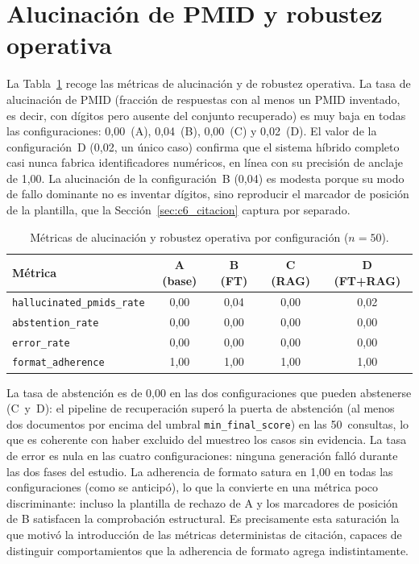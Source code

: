 \documentclass[11pt,a4paper,spanish]{book}
\numberwithin{equation}{chapter}
\numberwithin{figure}{chapter}
\begin{document}
\section{Alucinación de PMID y robustez operativa}
\label{sec:c6_robustez}

La Tabla~\ref{tab:c6_robustez} recoge las métricas de alucinación y de robustez operativa. La tasa de alucinación de PMID (fracción de respuestas con al menos un PMID inventado, es decir, con dígitos pero ausente del conjunto recuperado) es muy baja en todas las configuraciones: 0{,}00~(A), 0{,}04~(B), 0{,}00~(C) y 0{,}02~(D). El valor de la configuración~D (0{,}02, un único caso) confirma que el sistema híbrido completo casi nunca fabrica identificadores numéricos, en línea con su precisión de anclaje de 1{,}00. La alucinación de la configuración~B (0{,}04) es modesta porque su modo de fallo dominante no es inventar dígitos, sino reproducir el marcador de posición de la plantilla, que la Sección~\ref{sec:c6_citacion} captura por separado.

\begin{table}[h]
\centering
\begin{tabular}{|l|c|c|c|c|}
\hline
\textbf{Métrica} & \textbf{A (base)} & \textbf{B (FT)} & \textbf{C (RAG)} & \textbf{D (FT+RAG)} \\
\hline
\texttt{hallucinated\_pmids\_rate} & 0{,}00 & 0{,}04 & 0{,}00 & 0{,}02 \\
\hline
\texttt{abstention\_rate}         & 0{,}00 & 0{,}00 & 0{,}00 & 0{,}00 \\
\hline
\texttt{error\_rate}              & 0{,}00 & 0{,}00 & 0{,}00 & 0{,}00 \\
\hline
\texttt{format\_adherence}        & 1{,}00 & 1{,}00 & 1{,}00 & 1{,}00 \\
\hline
\end{tabular}
\caption{Métricas de alucinación y robustez operativa por configuración ($n=50$).}
\label{tab:c6_robustez}
\end{table}

La tasa de abstención es de 0{,}00 en las dos configuraciones que pueden abstenerse (C~y~D): el pipeline de recuperación superó la puerta de abstención (al menos dos documentos por encima del umbral \texttt{min\_final\_score}) en las 50~consultas, lo que es coherente con haber excluido del muestreo los casos sin evidencia. La tasa de error es nula en las cuatro configuraciones: ninguna generación falló durante las dos fases del estudio. La adherencia de formato satura en 1{,}00 en todas las configuraciones (como se anticipó), lo que la convierte en una métrica poco discriminante: incluso la plantilla de rechazo de A y los marcadores de posición de B satisfacen la comprobación estructural. Es precisamente esta saturación la que motivó la introducción de las métricas deterministas de citación, capaces de distinguir comportamientos que la adherencia de formato agrega indistintamente.
\end{document}
